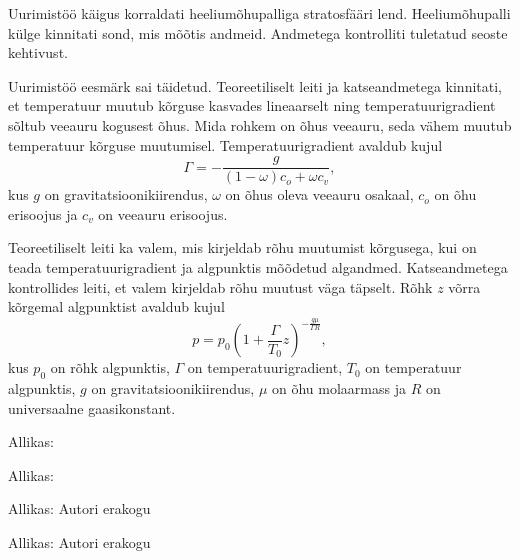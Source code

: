 \documentclass{trkut}%
\begin{document}
Uurimistöö käigus korraldati heeliumõhupalliga stratosfääri lend. Heeliumõhupalli külge kinnitati sond, mis mõõtis andmeid. Andmetega kontrolliti tuletatud seoste kehtivust.

Uurimistöö eesmärk sai täidetud. Teoreetiliselt leiti ja katseandmetega kinnitati, et temperatuur muutub kõrguse kasvades lineaarselt ning temperatuurigradient sõltub veeauru kogusest õhus. Mida rohkem on õhus veeauru, seda vähem muutub temperatuur kõrguse muutumisel. Temperatuurigradient avaldub kujul
\begin{equation*}
	\Gamma = -\frac{g}{(1-\omega)c_{o} + \omega c_{v}} ,
\end{equation*}
kus $g$ on gravitatsioonikiirendus, $\omega$ on õhus oleva veeauru osakaal, $c_o$ on õhu erisoojus ja $c_v$ on veeauru erisoojus.

Teoreetiliselt leiti ka valem, mis kirjeldab rõhu muutumist kõrgusega, kui on teada temperatuurigradient ja algpunktis mõõdetud algandmed. Katseandmetega kontrollides leiti, et valem kirjeldab rõhu muutust väga täpselt. Rõhk $z$ võrra kõrgemal algpunktist avaldub kujul 
\begin{equation*}
	p=p_0 \left(1+\frac{\Gamma}{T_0}z\right)^{ -\frac{g\mu}{\Gamma R}} ,
\end{equation*}
kus $p_0$ on rõhk algpunktis, $\Gamma$ on temperatuurigradient, $T_0$ on temperatuur algpunktis, $g$ on gravitatsioonikiirendus, $\mu$ on õhu molaarmass ja $R$ on universaalne gaasikonstant.




\printbibliography

\scriptsize
%
\normalsize
Allikas: \cite{logimine}

\scriptsize
%
\normalsize
Allikas: \cite{sensor}

\scriptsize
%
\normalsize
Allikas: Autori erakogu

\scriptsize
%
\normalsize
Allikas: Autori erakogu

%


\kinnitusleht%
\end{document}
